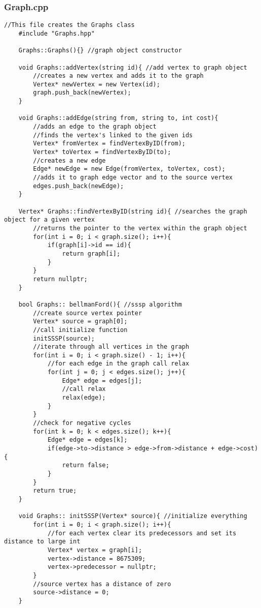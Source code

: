 \documentclass[letterpaper, 10pt,DIV=13]{scrartcl}
\numberwithin{equation}{section} %
\numberwithin{figure}{section} %
\numberwithin{table}{section} %
\begin{document}
\subsubsection*{Graph.cpp}
    \lstset{numbers=left, numberstyle=\tiny, stepnumber=1, numbersep=5pt, basicstyle=\footnotesize\ttfamily}
    \begin{lstlisting}[frame=single, ]
    //This file creates the Graphs class
    #include "Graphs.hpp"
    
    Graphs::Graphs(){} //graph object constructor
    
    void Graphs::addVertex(string id){ //add vertex to graph object
        //creates a new vertex and adds it to the graph
        Vertex* newVertex = new Vertex(id);
        graph.push_back(newVertex);
    }
    
    void Graphs::addEdge(string from, string to, int cost){ 
        //adds an edge to the graph object
        //finds the vertex's linked to the given ids
        Vertex* fromVertex = findVertexByID(from);
        Vertex* toVertex = findVertexByID(to);
        //creates a new edge
        Edge* newEdge = new Edge(fromVertex, toVertex, cost);
        //adds it to graph edge vector and to the source vertex
        edges.push_back(newEdge);
    }
    
    Vertex* Graphs::findVertexByID(string id){ //searches the graph object for a given vertex
        //returns the pointer to the vertex within the graph object
        for(int i = 0; i < graph.size(); i++){
            if(graph[i]->id == id){
                return graph[i];
            }
        }
        return nullptr;
    }
    
    bool Graphs:: bellmanFord(){ //sssp algorithm
        //create source vertex pointer
        Vertex* source = graph[0];
        //call initialize function
        initSSSP(source);
        //iterate through all vertices in the graph
        for(int i = 0; i < graph.size() - 1; i++){
            //for each edge in the graph call relax
            for(int j = 0; j < edges.size(); j++){
                Edge* edge = edges[j];
                //call relax
                relax(edge);
            }
        }
        //check for negative cycles
        for(int k = 0; k < edges.size(); k++){
            Edge* edge = edges[k];
            if(edge->to->distance > edge->from->distance + edge->cost){
                return false;
            }
        }
        return true;
    }
    
    void Graphs:: initSSSP(Vertex* source){ //initialize everything
        for(int i = 0; i < graph.size(); i++){
            //for each vertex clear its predecessors and set its distance to large int
            Vertex* vertex = graph[i];
            vertex->distance = 8675309;
            vertex->predecessor = nullptr;
        }
        //source vertex has a distance of zero
        source->distance = 0;
    }
    

\end{lstlisting}
\end{document}
